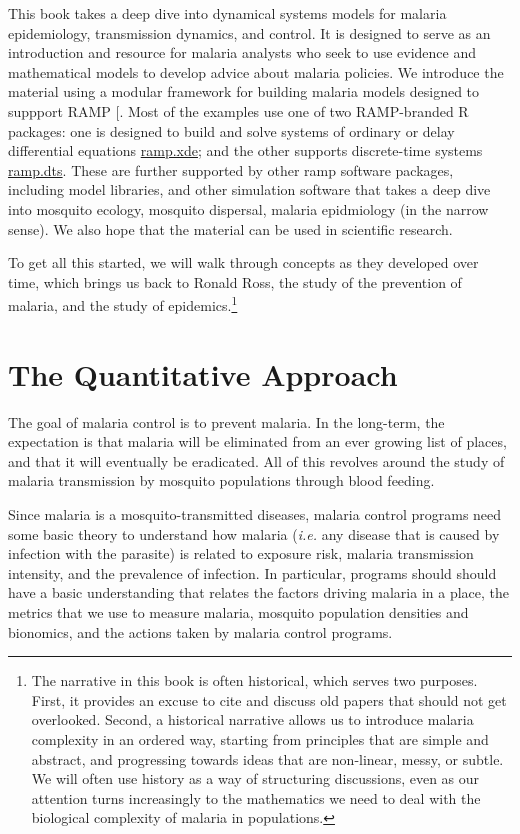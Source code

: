 \documentclass[
]{book}
\begin{document}
This book takes a deep dive into dynamical systems models for malaria epidemiology, transmission dynamics, and control. It is designed to serve as an introduction and resource for malaria analysts who seek to use evidence and mathematical models to develop advice about malaria policies. We introduce the material using a modular framework for building malaria models designed to suppport RAMP {[}\citeproc{ref-WuSL2023SpatialDynamics}{11}{]}. Most of the examples use one of two RAMP-branded R packages: one is designed to build and solve systems of ordinary or delay differential equations \href{https://dd-harp.github.io/ramp.xde/}{ramp.xde}; and the other supports discrete-time systems \href{https://dd-harp.github.io/ramp.dts/}{ramp.dts}. These are further supported by other ramp software packages, including model libraries, and other simulation software that takes a deep dive into mosquito ecology, mosquito dispersal, malaria epidmiology (in the narrow sense). We also hope that the material can be used in scientific research.

To get all this started, we will walk through concepts as they developed over time, which brings us back to Ronald Ross, the study of the prevention of malaria, and the study of epidemics.\footnote{The narrative in this book is often historical, which serves two purposes.
  First, it provides an excuse to cite and discuss old papers that should not get overlooked.
  Second, a historical narrative allows us to introduce malaria complexity in an ordered way, starting from principles that are simple and abstract, and progressing towards ideas that are non-linear, messy, or subtle.
  We will often use history as a way of structuring discussions, even as our attention turns increasingly to the mathematics we need to deal with the biological complexity of malaria in populations.}

\section{The Quantitative Approach}\label{the-quantitative-approach}

The goal of malaria control is to prevent malaria. In the long-term, the expectation is that malaria will be eliminated from an ever growing list of places, and that it will eventually be eradicated.
All of this revolves around the study of malaria transmission by mosquito populations through blood feeding.

Since malaria is a mosquito-transmitted diseases, malaria control programs need some basic theory to understand how malaria (\emph{i.e.} any disease that is caused by infection with the parasite) is related to exposure risk, malaria transmission intensity, and the prevalence of infection.
In particular, programs should should have a basic understanding that relates the factors driving malaria in a place, the metrics that we use to measure malaria, mosquito population densities and bionomics, and the actions taken by malaria control programs.
\end{document}
